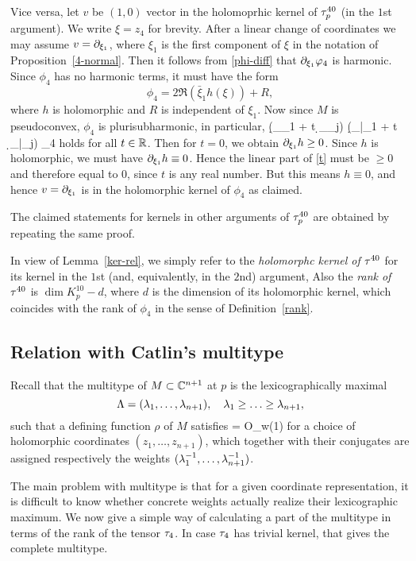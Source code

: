 \documentclass[12pt]{amsart}
\begin{document}
Vice versa, let $v$ be $(1,0)$ vector in the holomoprhic 
kernel of $\tau^{40}_p$ (in the $1$st argument).
We write $\xi=z_4$ for brevity.
After a linear change of coordinates we may assume 
$v=\partial_{\xi_1}$, where $\xi_1$ is the first component of $\xi$
in the notation of Proposition~\ref{4-normal}.
Then it follows from \eqref{phi-diff} that
$\partial_{\xi_1} \varphi_4$ is harmonic.
Since $\phi_4$ has no harmonic terms, it must have the form
$$
	\phi_4 = 2\Re (\bar\xi_1 h(\xi)) + R,
$$
where $h$ is holomorphic and $R$ is independent of $\xi_1$.
Now since $M$ is pseudoconvex, $\phi_4$ is plurisubharmonic,
in particular,
\beq{}
	(\d_{\xi_1} + t \d_{\xi_j}) (\d_{\bar\xi_1} + t \d_{\bar\xi_j}) 
	\phi_4 
\eeq
holds for all $t\in {\mathbb{R}}$.
Then for $t=0$, we obtain $\partial_{\xi_1}h\ge 0$.
Since $h$ is holomorphic, we must have $\partial_{\xi_1}h \equiv 0$.
Hence the linear part of \eqref{t} must be $\ge 0$
and therefore equal to $0$, since $t$ is any real number.
But this means $h\equiv 0$, and hence $v=\partial_{\xi_1}$ is in the 
holomorphic kernel of $\phi_4$ as claimed.

The claimed statements for kernels in other arguments of $\tau^{40}_p$
are obtained by 
repeating the same proof. 
\epf

In view of Lemma~\ref{ker-rel},
we simply refer to the {\em holomorphc kernel of $\tau^{40}$}
for its kernel in the $1$st (and, equivalently, in the $2$nd) argument,
Also the {\em rank of $\tau^{40}$} is 
$\dim K^{10}_p - d$,
where $d$ is the dimension of its holomorphic kernel,
which coincides with the rank of $\phi_4$
in the sense of Definition~\ref{rank}.



\subsection{Relation with Catlin's multitype}
Recall that the multitype of $M\subset {\mathbb{C}}^{n+1}$ at $p$
is the lexicographically maximal
$$
	\Lambda = (\lambda_1, \ldots, \lambda_{n+1}), 
	\quad
	\lambda_1 \ge \ldots \ge \lambda_{n+1},
$$
such that a defining function $\rho$ of $M$ 
satisfies 
\beq{}
	\rho = O_w(1)
\eeq
for a choice of holomorphic coordinates 
$(z_1, \ldots, z_{n+1})$,
which together with their conjugates are assigned 
respectively the weights 
$(\lambda_1^{-1}, \ldots, \lambda_{n+1}^{-1})$.

The main problem with multitype
is that for a given coordinate representation,
it is difficult to know whether concrete weights
actually realize their lexicographic maximum.
We now give a simple way of calculating a part 
of the multitype in terms of the rank of the tensor $\tau_4$.
In case $\tau_4$ has trivial kernel, that gives the complete multitype.
\end{document}
